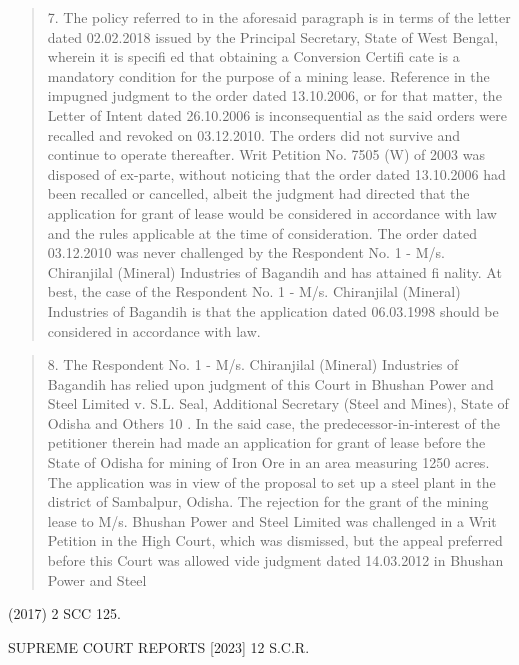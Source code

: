 \documentclass[12pt,a4paper]{article}
\newenvironment{judgequote}
  {\begin{quote}\small}
  {\end{quote}}
\begin{document}
\begin{judgequote}
7. The policy referred to in the aforesaid paragraph is in terms of the
letter dated 02.02.2018 issued by the Principal Secretary, State of West
Bengal, wherein it is specifi ed that obtaining a Conversion Certifi cate is a
mandatory condition for the purpose of a mining lease. Reference in the
impugned judgment to the order dated 13.10.2006, or for that matter, the
Letter of Intent dated 26.10.2006 is inconsequential as the said orders were
recalled and revoked on 03.12.2010. The orders did not survive and continue
to operate thereafter. Writ Petition No. 7505 (W) of 2003 was disposed of
ex-parte, without noticing that the order dated 13.10.2006 had been recalled
or cancelled, albeit the judgment had directed that the application for grant of
lease would be considered in accordance with law and the rules applicable at
the time of consideration. The order dated 03.12.2010 was never challenged
by the Respondent No. 1 - M/s. Chiranjilal (Mineral) Industries of Bagandih
and has attained fi nality. At best, the case of the Respondent No. 1 - M/s.
Chiranjilal (Mineral) Industries of Bagandih is that the application dated
06.03.1998 should be considered in accordance with law.
\end{judgequote}

\begin{judgequote}
8. The Respondent No. 1 - M/s. Chiranjilal (Mineral) Industries of
Bagandih has relied upon judgment of this Court in Bhushan Power and
Steel Limited v. S.L. Seal, Additional Secretary (Steel and Mines), State
of Odisha and Others 10 . In the said case, the predecessor-in-interest of the
petitioner therein had made an application for grant of lease before the State
of Odisha for mining of Iron Ore in an area measuring 1250 acres. The
application was in view of the proposal to set up a steel plant in the district
of Sambalpur, Odisha. The rejection for the grant of the mining lease to M/s.
Bhushan Power and Steel Limited was challenged in a Writ Petition in the
High Court, which was dismissed, but the appeal preferred before this Court
was allowed vide judgment dated 14.03.2012 in Bhushan Power and Steel
\end{judgequote}

 (2017) 2 SCC 125.




 SUPREME COURT REPORTS [2023] 12 S.C.R.
\end{document}
